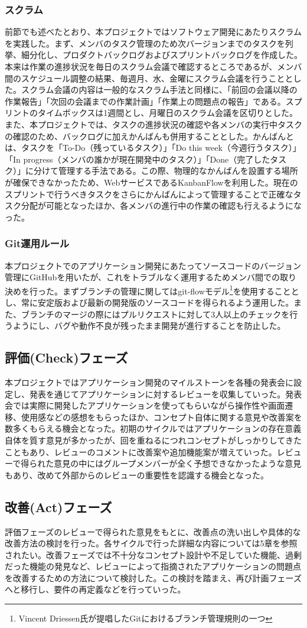 \subsubsection{スクラム}
前節でも述べたとおり、本プロジェクトではソフトウェア開発にあたりスクラムを実践した。まず、メンバのタスク管理のため次バージョンまでのタスクを列挙、細分化し、プロダクトバックログおよびスプリントバックログを作成した。本来は作業の進捗状況を毎日のスクラム会議で確認するところであるが、メンバ間のスケジュール調整の結果、毎週月、水、金曜にスクラム会議を行うこととした。スクラム会議の内容は一般的なスクラム手法と同様に、「前回の会議以降の作業報告」「次回の会議までの作業計画」「作業上の問題点の報告」である。スプリントのタイムボックスは1週間とし、月曜日のスクラム会議を区切りとした。また、本プロジェクトでは、タスクの進捗状況の確認や各メンバの実行中タスクの確認のため、バックログに加えかんばんも併用することとした。かんばんとは、タスクを「To-Do（残っているタスク）」「Do this week（今週行うタスク）」「In progress（メンバの誰かが現在開発中のタスク）」「Done（完了したタスク）」に分けて管理する手法である。この際、物理的なかんばんを設置する場所が確保できなかったため、WebサービスであるKanbanFlowを利用した。現在のスプリントで行うべきタスクをさらにかんばんによって管理することで正確なタスク分配が可能となったほか、各メンバの進行中の作業の確認も行えるようになった。
\subsubsection{Git運用ルール}
本プロジェクトでのアプリケーション開発にあたってソースコードのバージョン管理にGitHubを用いたが、これをトラブルなく運用するためメンバ間での取り決めを行った。まずブランチの管理に関してはgit-flowモデル\footnote{Vincent Driessen氏が提唱したGitにおけるブランチ管理規則の一つ}を使用することとし、常に安定版および最新の開発版のソースコードを得られるよう運用した。また、ブランチのマージの際にはプルリクエストに対して3人以上のチェックを行うようにし、バグや動作不良が残ったまま開発が進行することを防止した。
\subsection{評価(Check)フェーズ}
本プロジェクトではアプリケーション開発のマイルストーンを各種の発表会に設定し、発表を通じてアプリケーションに対するレビューを収集していった。発表会では実際に開発したアプリケーションを使ってもらいながら操作性や画面遷移、使用感などの感想をもらったほか、コンセプト自体に関する意見や改善案を数多くもらえる機会となった。初期のサイクルではアプリケーションの存在意義自体を質す意見が多かったが、回を重ねるにつれコンセプトがしっかりしてきたこともあり、レビューのコメントに改善案や追加機能案が増えていった。レビューで得られた意見の中にはグループメンバーが全く予想できなかったような意見もあり、改めて外部からのレビューの重要性を認識する機会となった。
\subsection{改善(Act)フェーズ}
評価フェーズのレビューで得られた意見をもとに、改善点の洗い出しや具体的な改善方法の検討を行った。各サイクルで行った詳細な内容については5章を参照されたい。改善フェーズでは不十分なコンセプト設計や不足していた機能、過剰だった機能の発見など、レビューによって指摘されたアプリケーションの問題点を改善するための方法について検討した。この検討を踏まえ、再び計画フェーズへと移行し、要件の再定義などを行っていった。
